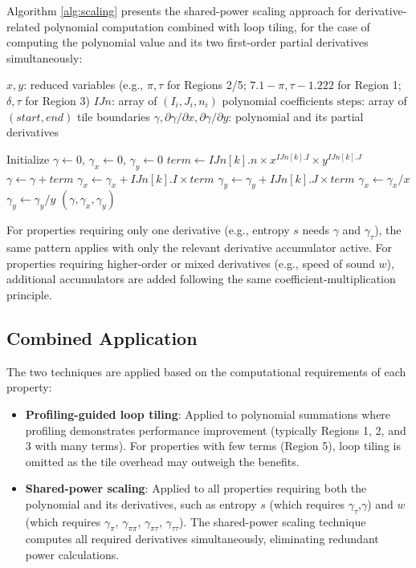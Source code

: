 \documentclass{article}
\begin{document}
Algorithm \ref{alg:scaling} presents the shared-power scaling approach for derivative-related polynomial computation combined with loop tiling, for the case of computing the polynomial value and its two first-order partial derivatives simultaneously:

\begin{algorithm}[H]
\caption{Shared-Power Scaling with Loop Tiling}
\label{alg:scaling}
\begin{algorithmic}[1]
\REQUIRE $x, y$: reduced variables (e.g., $\pi, \tau$ for Regions 2/5; $7.1{-}\pi, \tau{-}1.222$ for Region 1; $\delta, \tau$ for Region 3)
\REQUIRE $IJn$: array of $(I_i, J_i, n_i)$ polynomial coefficients
\REQUIRE $\text{steps}$: array of $(start, end)$ tile boundaries
\ENSURE $\gamma, \partial\gamma/\partial x, \partial\gamma/\partial y$: polynomial and its partial derivatives

\STATE Initialize $\gamma \leftarrow 0$, $\gamma_x \leftarrow 0$, $\gamma_y \leftarrow 0$
        \STATE $term \leftarrow IJn[k].n \times x^{IJn[k].I} \times y^{IJn[k].J}$
        \STATE $\gamma \leftarrow \gamma + term$
        \STATE $\gamma_x \leftarrow \gamma_x + IJn[k].I \times term$
        \STATE $\gamma_y \leftarrow \gamma_y + IJn[k].J \times term$
    \ENDFOR
\ENDFOR
\STATE $\gamma_x \leftarrow \gamma_x / x$
\STATE $\gamma_y \leftarrow \gamma_y / y$
\RETURN $(\gamma, \gamma_x, \gamma_y)$
\end{algorithmic}
\end{algorithm}

For properties requiring only one derivative (e.g., entropy $s$ needs $\gamma$ and $\gamma_\tau$), the same pattern applies with only the relevant derivative accumulator active. For properties requiring higher-order or mixed derivatives (e.g., speed of sound $w$), additional accumulators are added following the same coefficient-multiplication principle.

\subsection{Combined Application}

The two techniques are applied based on the computational requirements of each property:

\begin{itemize}
    \item \textbf{Profiling-guided loop tiling}: Applied to polynomial summations where profiling demonstrates performance improvement (typically Regions 1, 2, and 3 with many terms). For properties with few terms (Region 5), loop tiling is omitted as the tile overhead may outweigh the benefits.
    \item \textbf{Shared-power scaling}: Applied to all properties requiring both the polynomial and its derivatives, 
    such as entropy  $s$ (which requires $\gamma_\tau$,$\gamma$) and $w$ (which requires $\gamma_\pi$, $\gamma_{\pi\pi}$, $\gamma_{\pi\tau}$, $\gamma_{\tau\tau}$). The shared-power scaling technique computes all required derivatives simultaneously, eliminating redundant power calculations.
\end{itemize}
\end{document}

